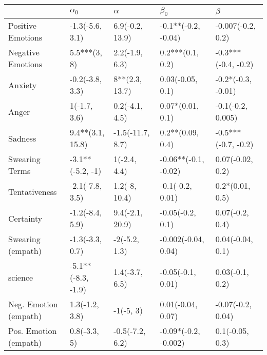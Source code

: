 \begin{tabular}{lllll}
\toprule
{} &          $\alpha_0$ &          $\alpha$ &             $\beta_0$ &              $\beta$ \\
\midrule
Positive Emotions     &     -1.3(-5.6, 3.1) &   6.9(-0.2, 13.9) &   -0.1**(-0.2, -0.04) &    -0.007(-0.2, 0.2) \\
Negative Emotions     &        5.5***(3, 8) &    2.2(-1.9, 6.3) &      0.2***(0.1, 0.2) &  -0.3***(-0.4, -0.2) \\
Anxiety               &     -0.2(-3.8, 3.3) &    8**(2.3, 13.7) &      0.03(-0.05, 0.1) &   -0.2*(-0.3, -0.01) \\
Anger                 &        1(-1.7, 3.6) &    0.2(-4.1, 4.5) &      0.07*(0.01, 0.1) &    -0.1(-0.2, 0.005) \\
Sadness               &    9.4**(3.1, 15.8) &  -1.5(-11.7, 8.7) &      0.2**(0.09, 0.4) &  -0.5***(-0.7, -0.2) \\
Swearing Terms        &    -3.1**(-5.2, -1) &      1(-2.4, 4.4) &  -0.06**(-0.1, -0.02) &     0.07(-0.02, 0.2) \\
Tentativeness         &     -2.1(-7.8, 3.5) &     1.2(-8, 10.4) &      -0.1(-0.2, 0.01) &      0.2*(0.01, 0.5) \\
Certainty             &     -1.2(-8.4, 5.9) &   9.4(-2.1, 20.9) &      -0.05(-0.2, 0.1) &      0.07(-0.2, 0.4) \\
Swearing (empath)     &     -1.3(-3.3, 0.7) &     -2(-5.2, 1.3) &   -0.002(-0.04, 0.04) &     0.04(-0.04, 0.1) \\
science               &  -5.1**(-8.3, -1.9) &    1.4(-3.7, 6.5) &     -0.05(-0.1, 0.01) &      0.03(-0.1, 0.2) \\
Neg. Emotion (empath) &      1.3(-1.2, 3.8) &         -1(-5, 3) &     0.01(-0.04, 0.07) &    -0.07(-0.2, 0.04) \\
Pos. Emotion (empath) &        0.8(-3.3, 5) &   -0.5(-7.2, 6.2) &  -0.09*(-0.2, -0.002) &      0.1(-0.05, 0.3) \\
\bottomrule
\end{tabular}

